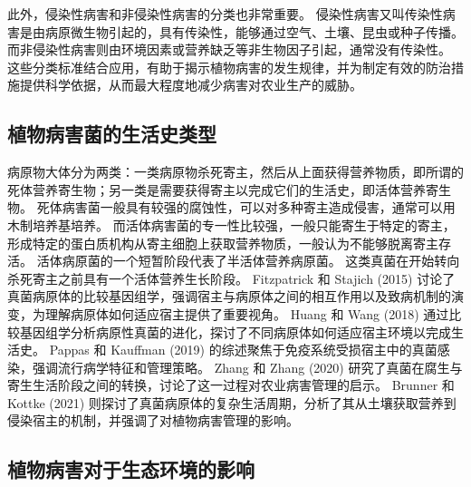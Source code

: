 \documentclass[AutoFakeBold]{LZUThesis-PgD&PhD}
\begin{document}
	此外，侵染性病害和非侵染性病害的分类也非常重要。
	侵染性病害又叫传染性病害是由病原微生物引起的，具有传染性，能够通过空气、土壤、昆虫或种子传播。
	而非侵染性病害则由环境因素或营养缺乏等非生物因子引起，通常没有传染性。
	这些分类标准结合应用，有助于揭示植物病害的发生规律，并为制定有效的防治措施提供科学依据，从而最大程度地减少病害对农业生产的威胁。
	
	\subsection{植物病害菌的生活史类型}
	
	病原物大体分为两类：一类病原物杀死寄主，然后从上面获得营养物质，即所谓的死体营养寄生物；另一类是需要获得寄主以完成它们的生活史，即活体营养寄生物。
	死体病害菌一般具有较强的腐蚀性，可以对多种寄主造成侵害，通常可以用木制培养基培养。
	而活体病害菌的专一性比较强，一般只能寄生于特定的寄主，形成特定的蛋白质机构从寄主细胞上获取营养物质，一般认为不能够脱离寄主存活。
	活体病原菌的一个短暂阶段代表了半活体营养病原菌。
	这类真菌在开始转向杀死寄主之前具有一个活体营养生长阶段。
	Fitzpatrick 和 Stajich (2015) 讨论了真菌病原体的比较基因组学，强调宿主与病原体之间的相互作用以及致病机制的演变，为理解病原体如何适应宿主提供了重要视角\cite{fitzpatrick2015comparative}。
	Huang 和 Wang (2018) 通过比较基因组学分析病原性真菌的进化，探讨了不同病原体如何适应宿主环境以完成生活史\cite{huang2018evolution}。
	Pappas 和 Kauffman (2019) 的综述聚焦于免疫系统受损宿主中的真菌感染，强调流行病学特征和管理策略\cite{pappas2019fungal}。
	Zhang 和 Zhang (2020) 研究了真菌在腐生与寄生生活阶段之间的转换，讨论了这一过程对农业病害管理的启示\cite{zhang2020fungi}。
	Brunner 和 Kottke (2021) 则探讨了真菌病原体的复杂生活周期，分析了其从土壤获取营养到侵染宿主的机制，并强调了对植物病害管理的影响\cite{brunner2021complex}。
	
	
	\subsection{植物病害对于生态环境的影响}
	
\end{document}
